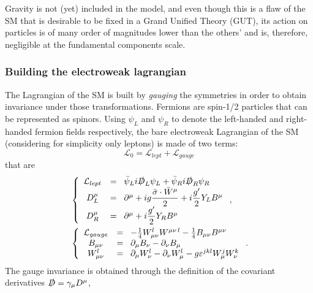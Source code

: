
Gravity is not (yet) included in the model, and even though
this is a flaw of the SM that is desirable to be fixed in a 
Grand Unified Theory (GUT), its action on particles is of many order
of magnitudes lower than the others' and is, therefore, negligible at the
fundamental components scale.


\subsubsection{Building the electroweak lagrangian}\label{sec:ewlagr}

The Lagrangian of the SM is built by {\it gauging} the symmetries in 
order to obtain invariance under those transformations.
Fermions are spin-1/2 particles that can be represented as spinors.
Using $\psi_{L}$ and 
$\psi_{R}$ to denote the left-handed and right-handed fermion fields 
respectively, 
the bare electroweak Lagrangian of the SM (considering 
for simplicity only leptons) is made of two terms:
\begin{equation}\label{eq:bareLagSM}
\mathcal{L}_{0} = \mathcal{L}_{lept}+ \mathcal{L}_{gauge}
\end{equation}
that are 
\begin{align}
&\left \{ \begin{array}{cl}
\mathcal{L}_{lept} &=\;\;  \bar\psi_{L}i\slashed{D}_{L}\psi_{L} + \bar\psi_{R}i\slashed{D}_{R}\psi_{R}\\
D_{L}^{\mu} &=\;\;  \partial^{\mu} + ig\dfrac{\bar{\sigma}\cdot\bar{W}^{\mu}}{2} + i\dfrac{g'}{2}Y_{L}B^{\mu}\\
D_{R}^{\mu} &=\;\;  \partial^{\mu} + i\dfrac{g'}{2}Y_{R}B^{\mu}
\end{array} \right. ,\label{eq:lagLep} \\
&\left \{ \begin{array}{cl}
\mathcal{L}_{gauge}  &=\;\;  -\frac{1}{4}W_{\mu\nu}^{l}W^{\mu\nu\, l}  -\frac{1}{4}B_{\mu\nu}B^{\mu\nu}\\
B_{\mu\nu} &=\;\;  \partial_{\mu}B_{\nu} - \partial_{\nu}B_{\mu}\\
W_{\mu\nu}^{l} &=\;\;  \partial_{\mu}W_{\nu}^{l} - \partial_{\nu}W_{\mu}^{l} - g\varepsilon^{jkl}W_{\mu}^{j}W_{\nu}^{k}
\end{array} \right. .\label{eq:lagGauge}
\end{align}
The gauge invariance is obtained through the definition of the
covariant derivatives $\slashed{D} = \gamma_{\mu}D^{\mu}$, 
